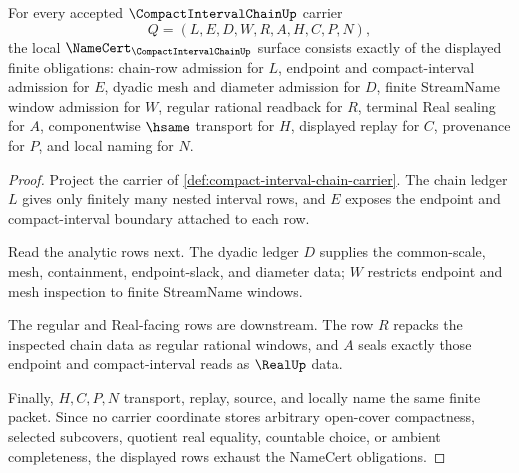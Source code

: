 \begin{theorem}
\label{thm:compact-interval-chain-namecert-obligations}
For every accepted $\CompactIntervalChainUp$ carrier
$$
Q=(L,E,D,W,R,A,H,C,P,N),
$$
the local $\NameCert_{\CompactIntervalChainUp}$ surface consists exactly of the displayed finite obligations: chain-row admission for $L$, endpoint and compact-interval admission for $E$, dyadic mesh and diameter admission for $D$, finite StreamName window admission for $W$, regular rational readback for $R$, terminal Real sealing for $A$, componentwise $\hsame$ transport for $H$, displayed replay for $C$, provenance for $P$, and local naming for $N$.
\end{theorem}
\begin{proof}
Project the carrier of \autoref{def:compact-interval-chain-carrier}. The chain ledger $L$ gives only finitely many nested interval rows, and $E$ exposes the endpoint and compact-interval boundary attached to each row.

Read the analytic rows next. The dyadic ledger $D$ supplies the common-scale, mesh, containment, endpoint-slack, and diameter data; $W$ restricts endpoint and mesh inspection to finite StreamName windows.

The regular and Real-facing rows are downstream. The row $R$ repacks the inspected chain data as regular rational windows, and $A$ seals exactly those endpoint and compact-interval reads as $\RealUp$ data.

Finally, $H,C,P,N$ transport, replay, source, and locally name the same finite packet. Since no carrier coordinate stores arbitrary open-cover compactness, selected subcovers, quotient real equality, countable choice, or ambient completeness, the displayed rows exhaust the NameCert obligations.
\end{proof}

